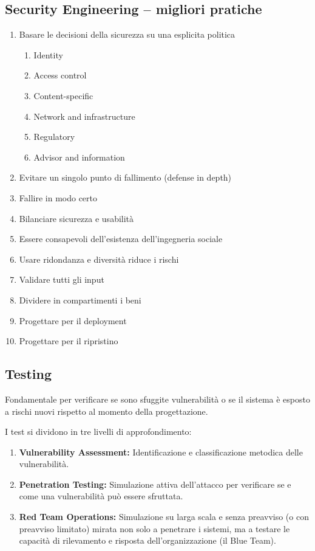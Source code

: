 \documentclass[12pt, a4paper]{report}
\begin{document}
\subsection{Security Engineering – migliori pratiche}
\begin{enumerate}
	\item Basare le decisioni della sicurezza su una esplicita politica
	\begin{enumerate}
		\item Identity
		\item Access control
		\item Content-specific
		\item Network and infrastructure
		\item Regulatory
		\item Advisor and information
	\end{enumerate}
	\item Evitare un singolo punto di fallimento (defense in depth)
	\item Fallire in modo certo
	\item Bilanciare sicurezza e usabilità
	\item Essere consapevoli dell'esistenza dell'ingegneria sociale
	\item Usare ridondanza e diversità riduce i rischi
	\item Validare tutti gli input
	\item Dividere in compartimenti i beni
	\item Progettare per il deployment
	\item Progettare per il ripristino
\end{enumerate}

\subsection{Testing}
Fondamentale per verificare se sono sfuggite vulnerabilità o se il sistema è esposto a rischi nuovi rispetto al momento della progettazione.

I test si dividono in tre livelli di approfondimento:

\begin{enumerate}
	\item \textbf{Vulnerability Assessment:} Identificazione e classificazione metodica delle vulnerabilità.
	\item \textbf{Penetration Testing:} Simulazione attiva dell'attacco per verificare se e come una vulnerabilità può essere sfruttata.
	\item \textbf{Red Team Operations:} Simulazione su larga scala e senza preavviso (o con preavviso limitato) mirata non solo a penetrare i sistemi, ma a testare le capacità di rilevamento e risposta dell'organizzazione (il Blue Team).
\end{enumerate}
\end{document}
